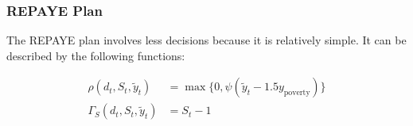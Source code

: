   \subsubsection{REPAYE Plan} \label{subsubsec:idr}

    The REPAYE plan involves less decisions because it is relatively simple. It can be described by
    the following functions:

    \begin{align*}
      \rho(d_t, S_t, \tilde{y}_t) &= \max \{ 0, \psi (\tilde{y}_t - 1.5 y_\text{poverty}) \} \\
      \Gamma_S(d_t, S_t, \tilde{y}_t) &= S_t - 1
    \end{align*}
